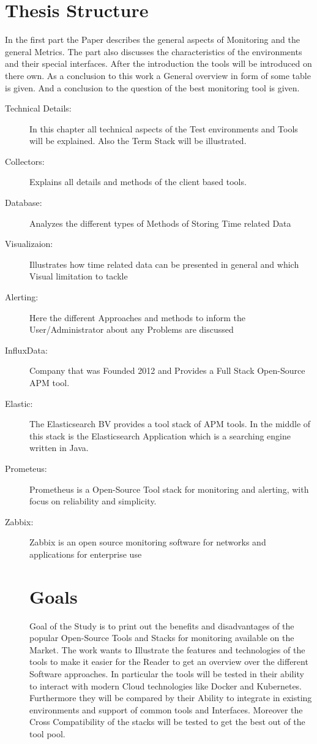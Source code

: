 \section*{Thesis Structure}
In the first part the Paper describes the general aspects of Monitoring and the general Metrics. The part also discusses the characteristics of the environments and their special interfaces. After the introduction the tools will be introduced on there own. As a conclusion to this work a General overview in form of some table is given. And a conclusion to the question of the best monitoring tool is given. 
\begin{description}
\item[Technical Details:] In this chapter all technical aspects of the Test environments and Tools will be explained. Also the Term Stack will be illustrated.  
\item[Collectors:] Explains all details and methods of the client based tools.
\item[Database:] Analyzes the different types of Methods of Storing Time related Data
\item[Visualizaion:] Illustrates how time related data can be presented in general and which Visual limitation to tackle  \\
\item[Alerting:] Here the different Approaches and methods to inform the User/Administrator about any Problems are discussed 
\\
\item[InfluxData:] Company that was Founded 2012 and Provides a Full Stack Open-Source APM tool.
\item[Elastic:] The Elasticsearch BV provides a tool stack of APM tools. In the middle of this stack is the Elasticsearch Application which is a searching engine written in Java. 
\item[Prometeus:]Prometheus is a Open-Source Tool stack for monitoring and alerting, with focus on reliability and simplicity.
\item[Zabbix:]Zabbix is an open source monitoring software for networks and applications for enterprise use
\section*{Goals}
Goal of the Study is to print out the benefits and disadvantages of the popular Open-Source Tools and Stacks  for monitoring available on the Market. The work wants to Illustrate the features and technologies of the tools to make it easier for the Reader to get an overview over the different Software approaches. In particular the tools will be tested in their ability to interact with modern Cloud technologies like Docker and Kubernetes. Furthermore they will be compared by their Ability to integrate in existing environments and support of common tools and Interfaces. Moreover the Cross Compatibility of the stacks will be tested to get the best out of the tool pool.
\end{description}
